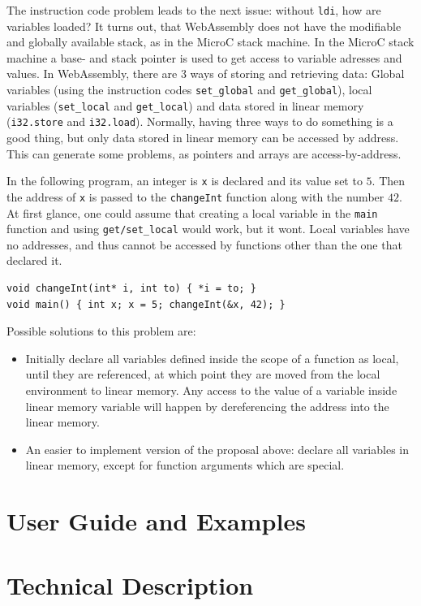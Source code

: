 \documentclass[a4paper]{article}
\begin{document}
The instruction code problem leads to the next issue: without \texttt{ldi}, how are variables loaded? It turns out, that WebAssembly does not have the modifiable and globally available stack, as in the MicroC stack machine. In the MicroC stack machine a base- and stack pointer is used to get access to variable adresses and values. In WebAssembly, there are 3 ways of storing and retrieving data: Global variables (using the instruction codes \texttt{set\_global} and \texttt{get\_global}), local variables (\texttt{set\_local} and \texttt{get\_local}) and data stored in linear memory (\texttt{i32.store} and \texttt{i32.load}). Normally, having three ways to do something is a good thing, but only data stored in linear memory can be accessed by address. This can generate some problems, as pointers and arrays are access-by-address.

In the following program, an integer is \texttt{x} is declared and its value set to $5$. Then the address of \texttt{x} is passed to the \texttt{changeInt} function along with the number $42$. At first glance, one could assume that creating a local variable in the \texttt{main} function and using \texttt{get/set\_local} would work, but it wont. Local variables have no addresses, and thus cannot be accessed by functions other than the one that declared it.
\begin{verbatim}
void changeInt(int* i, int to) { *i = to; }
void main() { int x; x = 5; changeInt(&x, 42); }
\end{verbatim}

Possible solutions to this problem are:
\begin{itemize}
	\item Initially declare all variables defined inside the scope of a function as local, until they are referenced, at which point they are moved from the local environment to linear memory. Any access to the value of a variable inside linear memory variable will happen by dereferencing the address into the linear memory.
	\item An easier to implement version of the proposal above: declare all variables in linear memory, except for function arguments which are special.
\end{itemize}

\section{User Guide and Examples}
\label{sec:user-guide}

\section{Technical Description}
\label{sec:technical}
\end{document}
